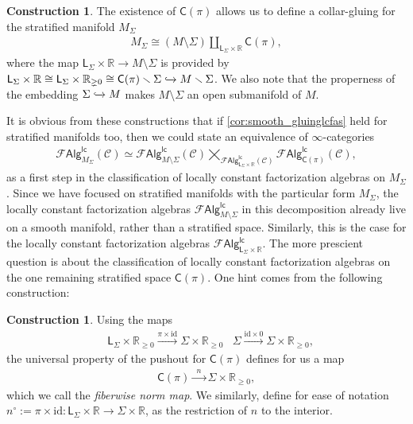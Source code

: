 \documentclass[12pt,a4paper]{article}
\newcounter{counter} \numberwithin{counter}{section}
\theoremstyle{definition}
\newtheorem{construction}[counter]{Construction}
\theoremstyle{plain}
\theoremstyle{remark}
\newcommand{\catC}{\mathscr{C}}
\newcommand{\lcfa}{\mathscr{F} \mathsf{Alg}^{\mathsf{lc}}}
\newcommand{\hoint}{\mathbb{R}_{\geq 0}}
\begin{document}
\begin{construction}
    The existence of $\mathsf{C}(\pi)$ allows us to define a collar-gluing for the stratified manifold $M_\Sigma$
    \begin{align}\label{eq:M_Sigma_decomposition}
        M_\Sigma \cong \left( M \setminus \Sigma \right) \coprod_{\mathsf{L}_\Sigma \times \mathbb{R}} \mathsf{C}(\pi),
    \end{align}
    where the map $\mathsf{L}_\Sigma \times \mathbb{R} \rightarrow M \setminus \Sigma$ is provided by $\mathsf{L}_\Sigma \times \mathbb{R} \cong \mathsf{L}_\Sigma \times \mathbb{R}_{\gneq 0} \cong \mathsf{C}(\pi) \setminus \Sigma \xhookrightarrow{} M \setminus \Sigma$. We also note that the properness of the embedding $\Sigma \xhookrightarrow{} M$ makes $M \setminus \Sigma$ an open submanifold of $M$.
\end{construction}


It is obvious from these constructions that if \cref{cor:smooth_gluinglcfas} held for stratified manifolds too, then we could state an equivalence of $\infty$-categories
%
\begin{align}
    \lcfa_{M_\Sigma} (\catC) \simeq \lcfa_{M \setminus \Sigma} (\catC) \bigtimes_{\lcfa_{\mathsf{L}_\Sigma \times \mathbb{R}} (\catC)} \lcfa_{\mathsf{C}(\pi)} (\catC),
\end{align}
%
as a first step in the classification of locally constant factorization algebras on $M_{\Sigma}$. Since we have focused on stratified manifolds with the particular form $M_{\Sigma}$, the locally constant factorization algebras $\lcfa_{M \setminus \Sigma}$ in this decomposition already live on a smooth manifold, rather than a stratified space. Similarly, this is the case for the locally constant factorization algebras $\lcfa_{\mathsf{L}_\Sigma \times \mathbb{R}}$. The more prescient question is about the classification of locally constant factorization algebras on the one remaining stratified space $\mathsf{C}(\pi)$. One hint comes from the following construction:

\begin{construction}\label{con:norm_map}
    Using the maps
    \begin{align}
        &\mathsf{L}_{\Sigma} \times \hoint \xrightarrow{\pi \times \mathrm{id}} \Sigma \times \hoint &\Sigma \xrightarrow{\mathrm{id} \times 0} \Sigma \times \hoint,
    \end{align}
    the universal property of the pushout for $\mathsf{C}(\pi)$ defines for us a map
    \begin{align}
        \mathsf{C}(\pi) \xrightarrow{\ \ n \ \ } \Sigma \times \hoint,
    \end{align}
    which we call the \emph{fiberwise norm map}. We similarly, define for ease of notation $n^\circ := \pi \times \mathrm{id}: \mathsf{L}_{\Sigma} \times \mathbb{R} \rightarrow \Sigma \times \mathbb{R}$, as the restriction of $n$ to the interior.
\end{construction}
\end{document}
